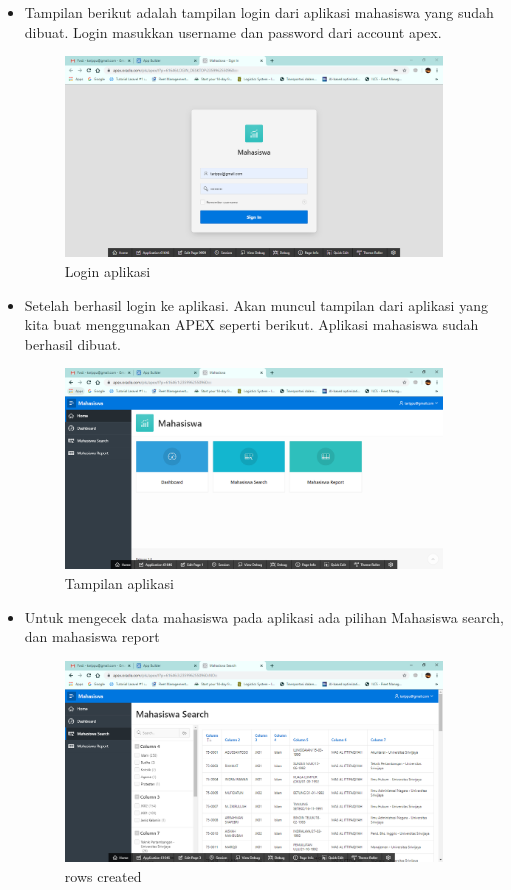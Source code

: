 \begin{itemize}
    \item Tampilan berikut adalah tampilan login dari aplikasi mahasiswa yang sudah dibuat. Login masukkan username dan password dari account apex.
     \begin{figure}[!htbp]
        \centering
        \includegraphics[width=10cm]{figures/14.PNG}
        \caption{Login aplikasi}
    \end{figure}
    
    \item Setelah berhasil login ke aplikasi. Akan muncul tampilan dari aplikasi yang kita buat menggunakan APEX seperti berikut. Aplikasi mahasiswa sudah berhasil dibuat.
    \begin{figure}[!htbp]
        \centering
        \includegraphics[width=10cm]{figures/15.PNG}
        \caption{Tampilan aplikasi}
    \end{figure}
    
    \newpage
    
    \item Untuk mengecek data mahasiswa pada aplikasi ada pilihan Mahasiswa search, dan mahasiswa report 
     \begin{figure}[!htbp]
        \centering
        \includegraphics[width=10cm]{figures/17.PNG}
        \caption{rows created}
    \end{figure}
    

\end{itemize}
